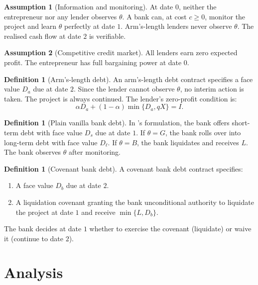 \documentclass[12pt,a4paper]{article}
\theoremstyle{plain}
\theoremstyle{definition}
\newtheorem{definition}[theorem]{Definition}
\newtheorem{assumption}{Assumption}
\theoremstyle{remark}
\begin{document}
\begin{assumption}[Information and monitoring]\label{a:info}
At date $0$, neither the entrepreneur nor any lender observes $\theta$. A bank can, at cost $c \geq 0$, monitor the project and learn $\theta$ perfectly at date $1$. Arm's-length lenders never observe $\theta$. The realised cash flow at date $2$ is verifiable.
\end{assumption}

\begin{assumption}[Competitive credit market]\label{a:comp}
All lenders earn zero expected profit. The entrepreneur has full bargaining power at date $0$.
\end{assumption}

\begin{definition}[Arm's-length debt]\label{d:arm}
An arm's-length debt contract specifies a face value $D_a$ due at date $2$. Since the lender cannot observe $\theta$, no interim action is taken. The project is always continued. The lender's zero-profit condition is:
\[
\alpha D_a + (1-\alpha)\min\{D_a, qX\} = I.
\]
\end{definition}

\begin{definition}[Plain vanilla bank debt]\label{d:rajan}
In \citeauthor{rajan1992}'s formulation, the bank offers short-term debt with face value $D_s$ due at date $1$. If $\theta = G$, the bank rolls over into long-term debt with face value $D_\ell$. If $\theta = B$, the bank liquidates and receives $L$. The bank observes $\theta$ after monitoring.
\end{definition}

\begin{definition}[Covenant bank debt]\label{d:cov}
A covenant bank debt contract specifies:
\begin{enumerate}[nosep,label=(\roman*)]
\item A face value $D_b$ due at date $2$.
\item A liquidation covenant granting the bank unconditional authority to liquidate the project at date $1$ and receive $\min\{L, D_b\}$.
\end{enumerate}
The bank decides at date $1$ whether to exercise the covenant (liquidate) or waive it (continue to date $2$).
\end{definition}

\section{Analysis}
\end{document}
